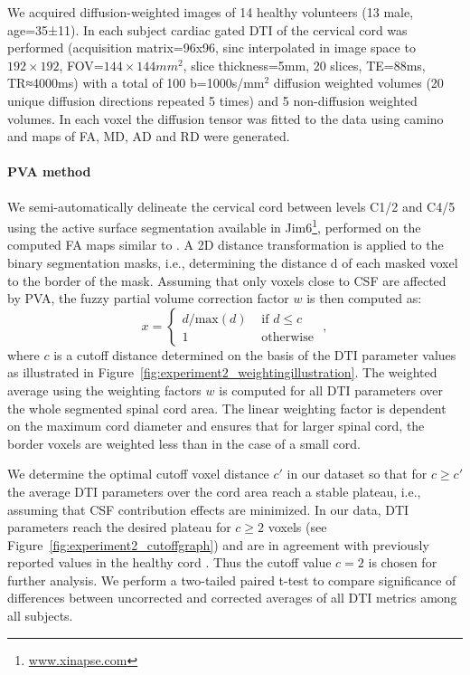 We acquired diffusion-weighted images of 14 healthy volunteers (13 male, age=35±11). In each subject cardiac gated DTI of the cervical cord was performed (acquisition matrix=96x96, sinc interpolated in image space to $192\times 192$, FOV=$144\times 144mm^2$, slice thickness=5mm, 20 slices, TE=88ms, TR≈4000ms) with a total of 100 b=1000s/mm$^2$ diffusion weighted volumes (20 unique diffusion directions repeated 5 times) and 5 non-diffusion weighted volumes. In each voxel the diffusion tensor was fitted to the data using camino \citep{Cook:2006} and maps of FA, MD, AD and RD were generated. 
\paragraph{PVA method} We semi-automatically delineate the cervical cord between levels C1/2 and C4/5 using the active surface segmentation \citep{Horsfield:2010} available in Jim6\footnote{\url{www.xinapse.com}}, performed on the computed FA maps similar to \citet{Wheeler-Kingshott:2002a}. A 2D distance transformation is applied to the binary segmentation masks, i.e., determining the distance d of each masked voxel to the border of the mask. Assuming that only voxels close to CSF are affected by PVA, the fuzzy partial volume correction factor $w$ is then computed as: 
\begin{equation}
	x =\left\{
	\begin{array}{lll}
		d/\mbox{max}(d)&\mbox{ if } d\leq c\\
		1&\mbox{ otherwise } 
	\end{array}
	\right.,	
\end{equation}
where $c$ is a cutoff distance determined on the basis of the DTI parameter values as illustrated in Figure~\ref{fig:experiment2_weightingillustration}. The weighted average using the weighting factors $w$ is computed for all DTI parameters over the whole segmented spinal cord area. The linear weighting factor is dependent on the maximum cord diameter and ensures that for larger spinal cord, the border voxels are weighted less than in the case of a small cord. 


We determine the optimal cutoff voxel distance $c'$ in our dataset so that for $c\geq c'$ the average DTI parameters over the cord area reach a stable plateau, i.e., assuming that CSF contribution effects are minimized. In our data, DTI parameters reach the desired plateau for $c\geq 2$ voxels (see Figure~\ref{fig:experiment2_cutoffgraph}) and are in agreement with previously reported values in the healthy cord \citep{Wheeler-Kingshott:2002a,Ellingson:2007}. Thus the cutoff value $c=2$ is chosen for further analysis. We perform a two-tailed paired t-test to compare significance of differences between uncorrected and corrected averages of all DTI metrics among all subjects. 
